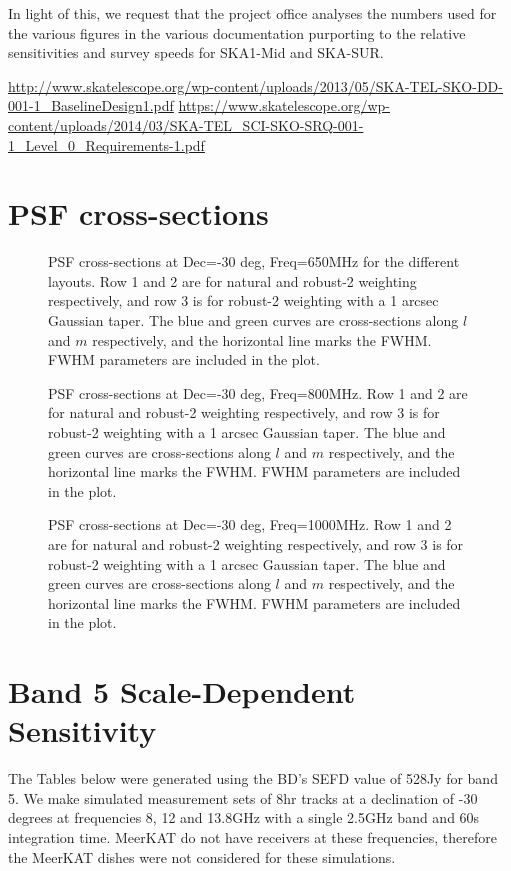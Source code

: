 \documentclass[sfheadings,a4paper,times,9pt,floats,floatfix]{article}
\begin{document}
In light of this, we request that the project office analyses the
numbers used for the various figures in the various documentation
purporting to the relative sensitivities and survey speeds for
SKA1-Mid and SKA-SUR.

\begin{thebibliography}{99}
  \url{http://www.skatelescope.org/wp-content/uploads/2013/05/SKA-TEL-SKO-DD-001-1_BaselineDesign1.pdf}
  \url{https://www.skatelescope.org/wp-content/uploads/2014/03/SKA-TEL_SCI-SKO-SRQ-001-1_Level_0_Requirements-1.pdf}
\end{thebibliography}
\pagebreak
\appendix
\section{PSF cross-sections}\label{app:psf}
\begin{figure}[H]
 \tiny{}
 \caption{PSF cross-sections at Dec=-30 deg, Freq=650MHz for the different layouts. Row 1 and 2 are for natural and robust-2
weighting respectively, and row
3 is for robust-2 weighting with a 1 arcsec Gaussian taper. The blue and green curves are cross-sections along $l$ and $m$
respectively, and the horizontal line marks the FWHM. FWHM parameters are included in the plot.}
\end{figure}
\begin{figure}[H]
 \tiny{}
 \caption{PSF cross-sections at Dec=-30 deg, Freq=800MHz. Row 1 and 2 are for natural and robust-2 weighting respectively, and 
row
3 is for robust-2 weighting with a 1 arcsec Gaussian taper. The blue and green curves are cross-sections along $l$ and $m$
respectively, and the horizontal line marks the FWHM. FWHM parameters are included in the plot.}
\end{figure}
\begin{figure}[H]
 \tiny{}
 \caption{PSF cross-sections at Dec=-30 deg, Freq=1000MHz. Row 1 and 2 are for natural and robust-2 weighting respectively, and
row
3 is for robust-2 weighting with a 1 arcsec Gaussian taper. The blue and green curves are cross-sections along $l$ and $m$
respectively, and the horizontal line marks the FWHM. FWHM parameters are included in the plot.}
\end{figure}
\section{Band 5 Scale-Dependent Sensitivity}\label{sec:band5}
The Tables below were generated using the BD's SEFD value of 528Jy for band 5. We make simulated measurement sets of 8hr tracks
at a declination of -30 degrees at frequencies 8, 12 and 13.8GHz with a single 2.5GHz band and 60s integration time. MeerKAT do
not have receivers at these frequencies, therefore the MeerKAT dishes were not considered for these simulations.








\end{document}
